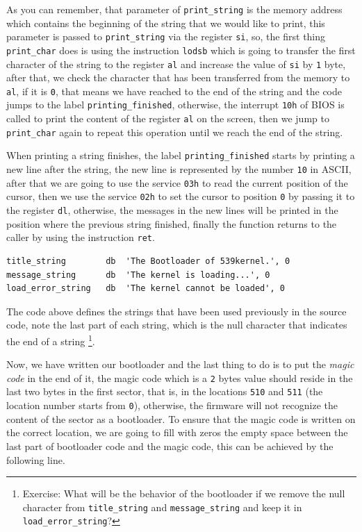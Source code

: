 As you can remember, that parameter of \lstinline!print_string! is the
memory address which contains the beginning of the string that we would
like to print, this parameter is passed to \lstinline!print_string! via
the register \lstinline!si!, so, the first thing \lstinline!print_char!
does is using the instruction \lstinline!lodsb! which is going to
transfer the first character of the string to the register
\lstinline!al! and increase the value of \lstinline!si! by \lstinline!1!
byte, after that, we check the character that has been transferred from
the memory to \lstinline!al!, if it is \lstinline!0!, that means we have
reached to the end of the string and the code jumps to the label
\lstinline!printing_finished!, otherwise, the interrupt \lstinline!10h!
of BIOS is called to print the content of the register \lstinline!al! on
the screen, then we jump to \lstinline!print_char! again to repeat this
operation until we reach the end of the string.

When printing a string finishes, the label \lstinline!printing_finished!
starts by printing a new line after the string, the new line is
represented by the number \lstinline!10! in ASCII, after that we are
going to use the service \lstinline!03h! to read the current position of
the cursor, then we use the service \lstinline!02h! to set the cursor to
position \lstinline!0! by passing it to the register \lstinline!dl!,
otherwise, the messages in the new lines will be printed in the position
where the previous string finished, finally the function returns to the
caller by using the instruction \lstinline!ret!.

\begin{lstlisting}
title_string        db  'The Bootloader of 539kernel.', 0
message_string      db  'The kernel is loading...', 0
load_error_string   db  'The kernel cannot be loaded', 0
\end{lstlisting}

The code above defines the strings that have been used previously in the
source code, note the last part of each string, which is the null
character that indicates the end of a string \footnote{Exercise: What
  will be the behavior of the bootloader if we remove the null character
  from \lstinline!title_string! and \lstinline!message_string! and keep
  it in \lstinline!load_error_string!?}.

Now, we have written our bootloader and the last thing to do is to put
the \emph{magic code} in the end of it, the magic code which is a
\lstinline!2! bytes value should reside in the last two bytes in the
first sector, that is, in the locations \lstinline!510! and
\lstinline!511! (the location number starts from \lstinline!0!),
otherwise, the firmware will not recognize the content of the sector as
a bootloader. To ensure that the magic code is written on the correct
location, we are going to fill with zeros the empty space between the
last part of bootloader code and the magic code, this can be achieved by
the following line.

